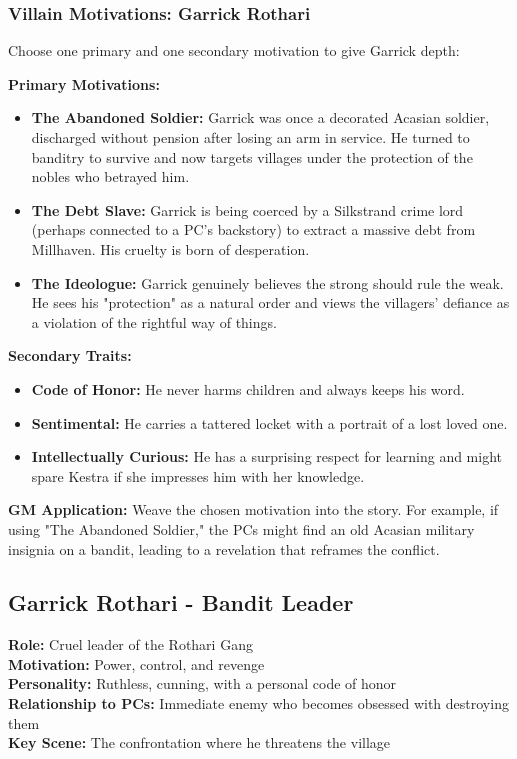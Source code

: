 \documentclass[11pt]{article}
\newenvironment{characterbox}[1]{%
  \begin{mdframed}[backgroundcolor=shadecolor, linewidth=1pt, linecolor=headercolor]%
  \subsection*{#1}%
}{%
  \end{mdframed}%
}
\newenvironment{mechanic}[1]{%
  \begin{mdframed}[backgroundcolor=tableheader, linewidth=1pt, linecolor=accentcolor]%
  \subsubsection*{#1}%
}{%
  \end{mdframed}%
}
\begin{document}
\begin{mechanic}{Villain Motivations: Garrick Rothari}

Choose one primary and one secondary motivation to give Garrick depth:

\textbf{Primary Motivations:}
\begin{itemize}
\item \textbf{The Abandoned Soldier:} Garrick was once a decorated Acasian soldier, discharged without pension after losing an arm in service. He turned to banditry to survive and now targets villages under the protection of the nobles who betrayed him.
\item \textbf{The Debt Slave:} Garrick is being coerced by a Silkstrand crime lord (perhaps connected to a PC's backstory) to extract a massive debt from Millhaven. His cruelty is born of desperation.
\item \textbf{The Ideologue:} Garrick genuinely believes the strong should rule the weak. He sees his "protection" as a natural order and views the villagers' defiance as a violation of the rightful way of things.
\end{itemize}

\textbf{Secondary Traits:}
\begin{itemize}
\item \textbf{Code of Honor:} He never harms children and always keeps his word.
\item \textbf{Sentimental:} He carries a tattered locket with a portrait of a lost loved one.
\item \textbf{Intellectually Curious:} He has a surprising respect for learning and might spare Kestra if she impresses him with her knowledge.
\end{itemize}

\textbf{GM Application:} Weave the chosen motivation into the story. For example, if using "The Abandoned Soldier," the PCs might find an old Acasian military insignia on a bandit, leading to a revelation that reframes the conflict.

\end{mechanic}

\begin{characterbox}{Garrick Rothari - Bandit Leader}
\textbf{Role:} Cruel leader of the Rothari Gang \\
\textbf{Motivation:} Power, control, and revenge \\
\textbf{Personality:} Ruthless, cunning, with a personal code of honor \\
\textbf{Relationship to PCs:} Immediate enemy who becomes obsessed with destroying them \\
\textbf{Key Scene:} The confrontation where he threatens the village
\end{characterbox}
\end{document}
